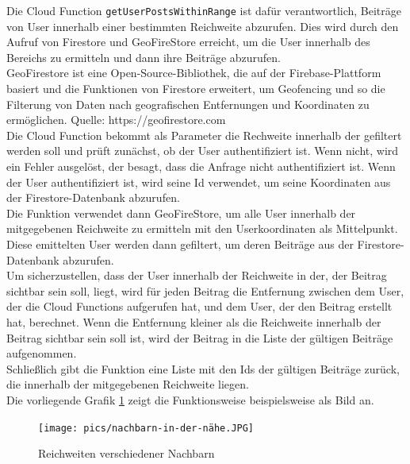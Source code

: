 Die Cloud Function \texttt{getUserPostsWithinRange} ist dafür verantwortlich, Beiträge von User innerhalb einer bestimmten Reichweite abzurufen. Dies wird durch den Aufruf von Firestore und GeoFireStore erreicht, um die User innerhalb des Bereichs zu ermitteln und dann ihre Beiträge abzurufen.
\\
GeoFirestore ist eine Open-Source-Bibliothek, die auf der Firebase-Plattform basiert und die Funktionen von Firestore erweitert, um Geofencing und so die Filterung von Daten nach geografischen Entfernungen und Koordinaten zu ermöglichen.
Quelle: https://geofirestore.com
\\
Die Cloud Function bekommt als Parameter die Rechweite innerhalb der gefiltert werden soll und prüft zunächst, ob der User authentifiziert ist. Wenn nicht, wird ein Fehler ausgelöst, der besagt, dass die Anfrage nicht authentifiziert ist. Wenn der User authentifiziert ist, wird seine Id verwendet, um seine Koordinaten aus der Firestore-Datenbank abzurufen.
\\
Die Funktion verwendet dann GeoFireStore, um alle User innerhalb der mitgegebenen Reichweite zu ermitteln mit den Userkoordinaten als Mittelpunkt. Diese emittelten User werden dann gefiltert, um deren Beiträge aus der Firestore-Datenbank abzurufen.
\\
Um sicherzustellen, dass der User innerhalb der Reichweite in der, der Beitrag sichtbar sein soll, liegt, wird für jeden Beitrag die Entfernung zwischen dem User, der die Cloud Functions aufgerufen hat, und dem User, der den Beitrag erstellt hat, berechnet. Wenn die Entfernung kleiner als die Reichweite innerhalb der Beitrag sichtbar sein soll ist, wird der Beitrag in die Liste der gültigen Beiträge aufgenommen.
\\
Schließlich gibt die Funktion eine Liste mit den Ids der gültigen Beiträge zurück, die innerhalb der mitgegebenen Reichweite liegen.
\\
Die vorliegende Grafik \ref{fig:near-neighbours} zeigt die Funktionsweise beispielsweise als Bild an.

\begin{figure}[h]
  \centering
  \texttt{[image: pics/nachbarn-in-der-nähe.JPG]}
  \caption{Reichweiten verschiedener Nachbarn}
  \label{fig:near-neighbours}
\end{figure}

